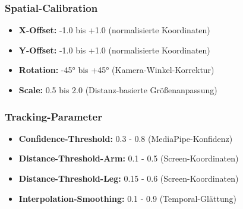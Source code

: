 \subsubsection{Spatial-Calibration}
\begin{itemize}
    \item \textbf{X-Offset:} -1.0 bis +1.0 (normalisierte Koordinaten)
    \item \textbf{Y-Offset:} -1.0 bis +1.0 (normalisierte Koordinaten)
    \item \textbf{Rotation:} -45° bis +45° (Kamera-Winkel-Korrektur)
    \item \textbf{Scale:} 0.5 bis 2.0 (Distanz-basierte Größenanpassung)
\end{itemize}

\subsubsection{Tracking-Parameter}
\begin{itemize}
    \item \textbf{Confidence-Threshold:} 0.3 - 0.8 (MediaPipe-Konfidenz)
    \item \textbf{Distance-Threshold-Arm:} 0.1 - 0.5 (Screen-Koordinaten)
    \item \textbf{Distance-Threshold-Leg:} 0.15 - 0.6 (Screen-Koordinaten)
    \item \textbf{Interpolation-Smoothing:} 0.1 - 0.9 (Temporal-Glättung)
\end{itemize}